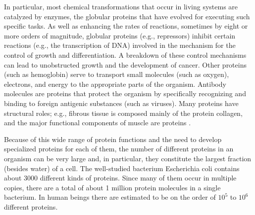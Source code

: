 In particular, most chemical transformations that occur in living systems are catalyzed by enzymes, the globular proteins that have evolved for executing such specific tasks. 
As well as enhancing the rates of reactions, sometimes by eight or more orders of magnitude, globular proteins (e.g., repressors) inhibit certain reactions (e.g., the transcription of DNA) involved in the mechanism for the control of growth and differentiation. A breakdown of these control mechanisms can lead to unobstructed growth and the development of cancer. 
Other proteins (such as hemoglobin) serve to transport small molecules (such as oxygen), electrons, and energy to the appropriate parts of the organism. 
Antibody molecules are proteins that protect the organism by specifically recognizing and binding to foreign antigenic substances (such as viruses). 
Many proteins have structural roles; e.g., fibrous tissue is composed mainly of the protein collagen, and the major functional components of muscle are proteins
\cite{brooks1988proteins}.

Because of this wide range of protein functions and the need to develop specialized proteins for each of them, the number of different proteins in an organism can be very large and, in particular, they constitute the largest fraction (besides water) of a cell. The well-studied bacterium Escherichia coli contains about 3000 different kinds of proteins. Since many of them occur in multiple copies, there are a total of about 1 million protein molecules in a single bacterium. In human beings there are estimated to be on the order of $10^5$ to $10^6$ different proteins.

